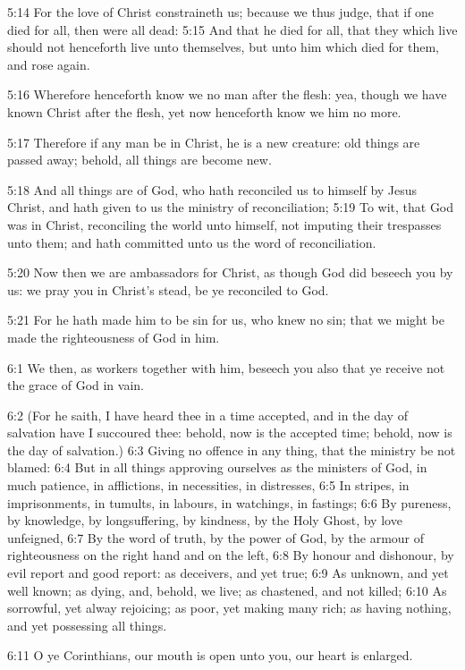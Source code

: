 5:14 For the love of Christ constraineth us; because we thus judge, that if one died for all, then were all dead: 5:15 And that he died for all, that they which live should not henceforth live unto themselves, but unto him which died for them, and rose again.

5:16 Wherefore henceforth know we no man after the flesh: yea, though we have known Christ after the flesh, yet now henceforth know we him no more.

5:17 Therefore if any man be in Christ, he is a new creature: old things are passed away; behold, all things are become new.

5:18 And all things are of God, who hath reconciled us to himself by Jesus Christ, and hath given to us the ministry of reconciliation; 5:19 To wit, that God was in Christ, reconciling the world unto himself, not imputing their trespasses unto them; and hath committed unto us the word of reconciliation.

5:20 Now then we are ambassadors for Christ, as though God did beseech you by us: we pray you in Christ's stead, be ye reconciled to God.

5:21 For he hath made him to be sin for us, who knew no sin; that we might be made the righteousness of God in him.

6:1 We then, as workers together with him, beseech you also that ye receive not the grace of God in vain.

6:2 (For he saith, I have heard thee in a time accepted, and in the day of salvation have I succoured thee: behold, now is the accepted time; behold, now is the day of salvation.)  6:3 Giving no offence in any thing, that the ministry be not blamed: 6:4 But in all things approving ourselves as the ministers of God, in much patience, in afflictions, in necessities, in distresses, 6:5 In stripes, in imprisonments, in tumults, in labours, in watchings, in fastings; 6:6 By pureness, by knowledge, by longsuffering, by kindness, by the Holy Ghost, by love unfeigned, 6:7 By the word of truth, by the power of God, by the armour of righteousness on the right hand and on the left, 6:8 By honour and dishonour, by evil report and good report: as deceivers, and yet true; 6:9 As unknown, and yet well known; as dying, and, behold, we live; as chastened, and not killed; 6:10 As sorrowful, yet alway rejoicing; as poor, yet making many rich; as having nothing, and yet possessing all things.

6:11 O ye Corinthians, our mouth is open unto you, our heart is enlarged.

